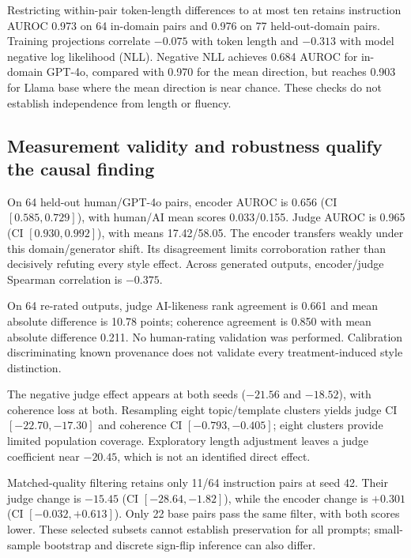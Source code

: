Restricting within-pair token-length differences to at most ten retains instruction AUROC 0.973 on 64 in-domain pairs and 0.976 on 77 held-out-domain pairs. Training projections correlate $-0.075$ with token length and $-0.313$ with model negative log likelihood (NLL). Negative NLL achieves 0.684 AUROC for in-domain GPT-4o, compared with 0.970 for the mean direction, but reaches 0.903 for Llama base where the mean direction is near chance. These checks do not establish independence from length or fluency.

\subsection{Measurement validity and robustness qualify the causal finding}
On 64 held-out \hape human/GPT-4o pairs, encoder AUROC is 0.656 (CI $[0.585,0.729]$), with human/AI mean scores 0.033/0.155. Judge AUROC is 0.965 (CI $[0.930,0.992]$), with means 17.42/58.05. The encoder transfers weakly under this domain/generator shift. Its disagreement limits corroboration rather than decisively refuting every style effect. Across generated outputs, encoder/judge Spearman correlation is $-0.375$.

On 64 re-rated outputs, judge AI-likeness rank agreement is 0.661 and mean absolute difference is 10.78 points; coherence agreement is 0.850 with mean absolute difference 0.211. No human-rating validation was performed. Calibration discriminating known provenance does not validate every treatment-induced style distinction.

The negative judge effect appears at both seeds ($-21.56$ and $-18.52$), with coherence loss at both. Resampling eight topic/template clusters yields judge CI $[-22.70,-17.30]$ and coherence CI $[-0.793,-0.405]$; eight clusters provide limited population coverage. Exploratory length adjustment leaves a judge coefficient near $-20.45$, which is not an identified direct effect.

Matched-quality filtering retains only 11/64 instruction pairs at seed 42. Their judge change is $-15.45$ (CI $[-28.64,-1.82]$), while the encoder change is $+0.301$ (CI $[-0.032,+0.613]$). Only 22 base pairs pass the same filter, with both scores lower. These selected subsets cannot establish preservation for all prompts; small-sample bootstrap and discrete sign-flip inference can also differ.
